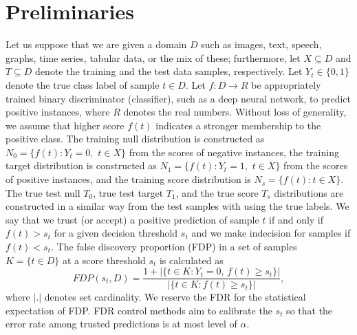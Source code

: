 \documentclass{article}
\begin{document}
\section{Preliminaries}

Let us suppose that we are given a domain $D$ such as images, text, speech, graphs, time series, tabular data, or the mix of these; furthermore, let $X\subseteq D$ and $T\subseteq D$ denote the training and  the test data samples, respectively. Let $Y_t\in\{0,1\}$ denote the true class label of sample $t\in D$. Let $f:D\rightarrow R$ be appropriately trained binary discriminator (classifier), such as a deep neural network, to predict positive instances, where $R$ denotes the real numbers. Without loss of generality, we assume that higher score $f(t)$ indicates a stronger membership to the positive class. The training null distribution is constructed as $N_0=\{f(t):Y_t = 0,\,\,  t\in X\}$ from the scores of negative instances, the training target distribution is constructed as $N_1=\{f(t): Y_t = 1,\,\,  t\in X\}$ from the scores of positive instances, and the training score distribution is $N_s=\{f(t): t\in X\}$. The true test null $T_0$, true test target $T_1$, and the true score $T_s$ distributions are constructed in a similar way from the test samples with using the true labels. We say that we trust (or accept) a positive prediction of sample $t$ if and only if $f(t)>s_t$ for a given decision threshold  $s_t$ and we make indecision for samples if $f(t) < s_t$. The false discovery proportion (FDP) in a set of samples $K=\{t\in D\}$ at a score threshold $s_t$ is calculated as 
\begin{equation*}
	FDP(s_t,D)=\frac{1+|\{t\in K: Y_t=0,\,f(t)\ge s_t\}|}{|\{t\in K:f(t)\ge s_t\}|},
\end{equation*}
\noindent where $|.|$ denotes set cardinality. We reserve the FDR for the statistical expectation of FDP. FDR control methods aim to calibrate the $s_t$ so that the error rate among trusted predictions is at most level of $\alpha$. %

\end{document}
